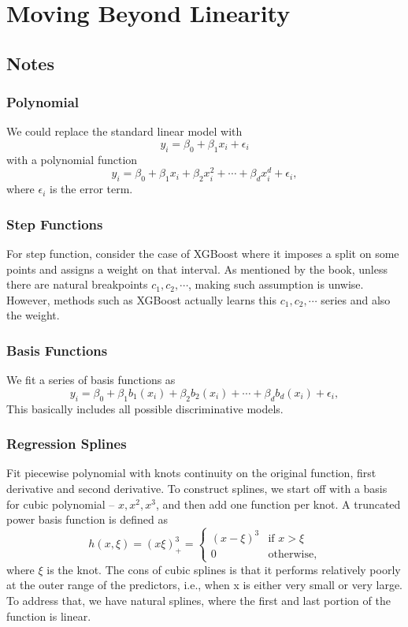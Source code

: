 \section{Moving Beyond Linearity}
\subsection{Notes}
\subsubsection{Polynomial}
We could replace the standard linear model with $$y_i = \beta_0 + \beta_1 x_i + \epsilon_i$$ with a polynomial function $$ y_i = \beta_0 + \beta_1 x_i + \beta_2 x_i^2 + \cdots + \beta_d x_i^d + \epsilon_i,$$ where $\epsilon_i$ is the error term.

\subsubsection{Step Functions}
\begin{tbox}
For step function, consider the case of XGBoost where it imposes a split on some points and assigns a weight on that interval. As mentioned by the book, unless there are natural breakpoints $c_1, c_2, \cdots$, making such assumption is unwise. However, methods such as XGBoost actually learns this $c_1, c_2, \cdots$ series and also the weight.
\end{tbox}

\subsubsection{Basis Functions}
We fit a series of basis functions as $$ y_i = \beta_0 + \beta_1 b_1(x_i) + \beta_2 b_2(x_i) + \cdots + \beta_d b_d(x_i)+ \epsilon_i,$$ This basically includes all possible discriminative models.

\subsubsection{Regression Splines}
Fit piecewise polynomial with knots continuity on the original function, first derivative and second derivative. To construct splines, we start off with a basis for cubic polynomial -- $x, x^2, x^3$, and then add one  function per knot. A truncated power basis function is defined as $$ h(x, \xi) = (x \xi)^3_+ = \begin{cases} (x - \xi)^3  &\text{if } x > \xi \\ 0 & \text{otherwise},
\end{cases} $$ where $\xi$ is the knot. The cons of cubic splines is that it performs relatively poorly at the outer range of the predictors, i.e., when x is either very small or very large. To address that, we have natural splines, where the first and last portion of the function is linear.


